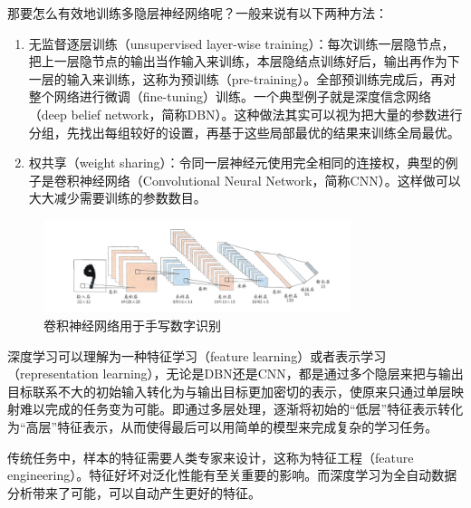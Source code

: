 \documentclass[12pt, a4paper]{article} %
\begin{document}
那要怎么有效地训练多隐层神经网络呢？一般来说有以下两种方法：

\begin{enumerate}[\hspace*{2em} i.]
    \item 无监督逐层训练（unsupervised layer-wise training）：每次训练一层隐节点，把上一层隐节点的输出当作输入来训练，本层隐结点训练好后，输出再作为下一层的输入来训练，这称为预训练（pre-training）。全部预训练完成后，再对整个网络进行微调（fine-tuning）训练。一个典型例子就是深度信念网络（deep belief network，简称DBN）。这种做法其实可以视为把大量的参数进行分组，先找出每组较好的设置，再基于这些局部最优的结果来训练全局最优。
    \item 权共享（weight sharing）：令同一层神经元使用完全相同的连接权，典型的例子是卷积神经网络（Convolutional Neural Network，简称CNN）。这样做可以大大减少需要训练的参数数目。
\end{enumerate}

\begin{figure}[H]
    \centering
    \includegraphics[width=0.8\textwidth]{../img/5-9-卷积神经网络用于手写数字识别.png}
    \caption{卷积神经网络用于手写数字识别}
    \label{fig:卷积神经网络用于手写数字识别}
\end{figure}

深度学习可以理解为一种特征学习（feature learning）或者表示学习（representation learning），无论是DBN还是CNN，都是通过多个隐层来把与输出目标联系不大的初始输入转化为与输出目标更加密切的表示，使原来只通过单层映射难以完成的任务变为可能。即通过多层处理，逐渐将初始的“低层”特征表示转化为“高层”特征表示，从而使得最后可以用简单的模型来完成复杂的学习任务。

传统任务中，样本的特征需要人类专家来设计，这称为特征工程（feature engineering）。特征好坏对泛化性能有至关重要的影响。而深度学习为全自动数据分析带来了可能，可以自动产生更好的特征。
\end{document}
